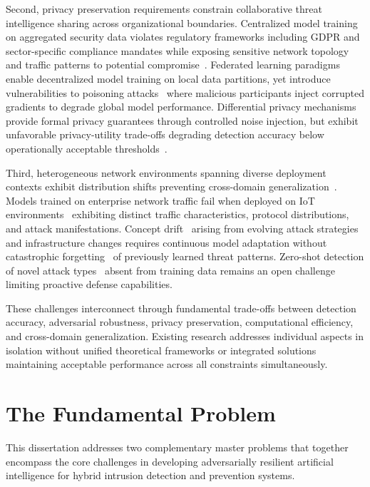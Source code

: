 Second, privacy preservation requirements constrain collaborative threat intelligence sharing across organizational boundaries. Centralized model training on aggregated security data violates regulatory frameworks including GDPR and sector-specific compliance mandates while exposing sensitive network topology and traffic patterns to potential compromise~\cite{zhao2019privacy}. Federated learning paradigms~\cite{mcmahan2017communication} enable decentralized model training on local data partitions, yet introduce vulnerabilities to poisoning attacks~\cite{fang2020local} where malicious participants inject corrupted gradients to degrade global model performance. Differential privacy mechanisms~\cite{dwork2006calibrating,abadi2016deep} provide formal privacy guarantees through controlled noise injection, but exhibit unfavorable privacy-utility trade-offs degrading detection accuracy below operationally acceptable thresholds~\cite{papernot2018sok}.

Third, heterogeneous network environments spanning diverse deployment contexts exhibit distribution shifts preventing cross-domain generalization~\cite{zhao2019learning,ganin2016domain}. Models trained on enterprise network traffic fail when deployed on IoT environments~\cite{zeadally2020design} exhibiting distinct traffic characteristics, protocol distributions, and attack manifestations. Concept drift~\cite{gama2014survey} arising from evolving attack strategies and infrastructure changes requires continuous model adaptation without catastrophic forgetting~\cite{kirkpatrick2017overcoming} of previously learned threat patterns. Zero-shot detection of novel attack types~\cite{fang2023llm4ids} absent from training data remains an open challenge limiting proactive defense capabilities.

These challenges interconnect through fundamental trade-offs between detection accuracy, adversarial robustness, privacy preservation, computational efficiency, and cross-domain generalization. Existing research addresses individual aspects in isolation without unified theoretical frameworks or integrated solutions maintaining acceptable performance across all constraints simultaneously.

\section*{The Fundamental Problem}

This dissertation addresses two complementary master problems that together encompass the core challenges in developing adversarially resilient artificial intelligence for hybrid intrusion detection and prevention systems.


